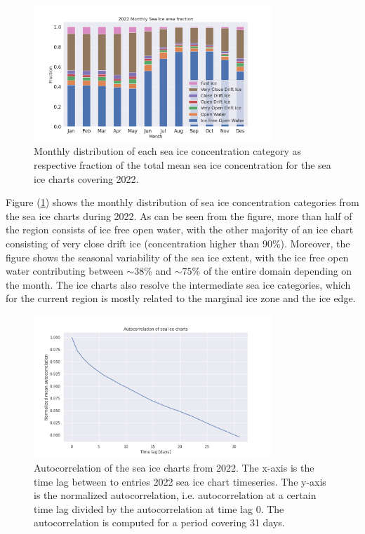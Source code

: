 \documentclass[../main/thesis.tex]{subfiles}
\begin{document}
\begin{figure}
    \centering
    \includegraphics[width=0.8\textwidth]{2022-sic-distribution}
    \caption{\label{fig:2022-areadist-sic}Monthly distribution of each sea ice concentration category as respective fraction of the total mean sea ice concentration for the sea ice charts covering 2022.}
\end{figure}

Figure (\ref{fig:2022-areadist-sic}) shows the monthly distribution of sea ice concentration categories from the sea ice charts during 2022. As can be seen from the figure, more than half of the region consists of ice free open water, with the other majority of an ice chart consisting of very close drift ice (concentration higher than 90\%). Moreover, the figure shows the seasonal variability of the sea ice extent, with the ice free open water contributing between $\sim38$\% and $\sim75$\% of the entire domain depending on the month. The ice charts also resolve the intermediate sea ice categories, which for the current region is mostly related to the marginal ice zone and the ice edge.

\begin{figure}
    \centering
    \includegraphics[width = 0.8\textwidth]{autocorr_icechart}
    \caption{\label{fig:autocorr}Autocorrelation of the sea ice charts from 2022. The x-axis is the time lag between to entries 2022 sea ice chart timeseries. The y-axis is the normalized autocorrelation, i.e. autocorrelation at a certain time lag divided by the autocorrelation at time lag 0. The autocorrelation is computed for a period covering 31 days.}
\end{figure}
\end{document}
